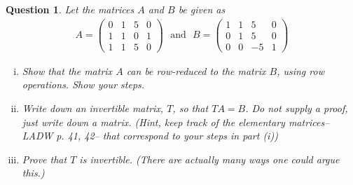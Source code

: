 \documentclass[12pt]{article}
\newtheorem{question}[thm]{Question}
\begin{document}
\begin{question}
	\normalfont
	
	Let the matrices $A$ and $B$ be given as 
	\begin{align*}
		A=
		\begin{pmatrix}
			0 & 1 & 5 & 0\\
			1 & 1 & 0 & 1\\
			1 & 1 & 5 & 0
		\end{pmatrix}
		\ \ \ \text{and}\ \ \ 
		B=
		\begin{pmatrix}
			1 & 1 & 5 & 0\\
			0 & 1 & 5 & 0\\
			0 & 0 & -5 & 1
		\end{pmatrix}
	\end{align*}
	
	
	\begin{enumerate}[(i)]
		\item Show that the matrix $A$ can be row-reduced to the matrix $B$, using row operations.  Show your steps.
		
		\item Write down an invertible matrix, $T$, so that $TA=B$.  Do not supply a proof, just write down a matrix.  (Hint, keep track of the elementary matrices-- LADW p. 41, 42-- that correspond to your steps in part (i))
		
		\item Prove that $T$ is invertible.  (There are actually many ways one could argue this.)
	\end{enumerate}
	 
	
	
\end{question}

\vspace{1cm}
\end{document}
